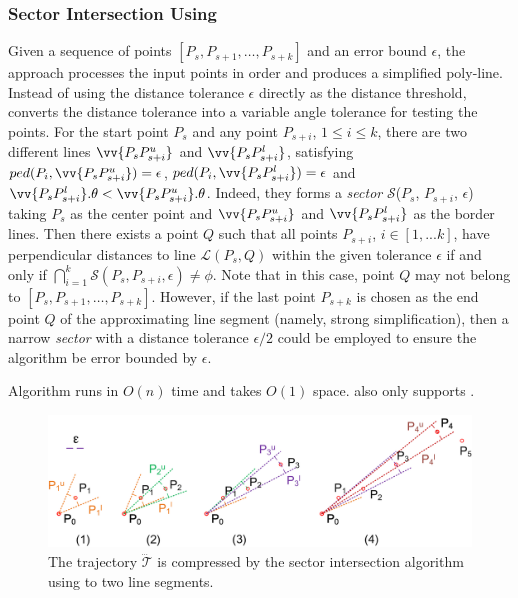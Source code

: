 \subsubsection {Sector Intersection Using \ped}
\label{sec-siped}

Given a sequence of points $[P_{s}, P_{s+1}, \ldots, P_{s+k}]$ and an error bound $\epsilon$, the \siped approach processes the input points in order and produces a simplified poly-line. Instead of using the distance tolerance $\epsilon$ directly as the distance threshold, \siped converts the distance tolerance into a variable angle tolerance for testing the points.
%
For the start point $P_s$ and any point $P_{s+i}$, $1\le i\le k$, there are two different lines $\vv{P_sP^u_{s+i}}$ and $\vv{P_sP^l_{s+i}}$, satisfying $ped(P_i, \vv{P_sP^u_{s+i}}) = \epsilon$, $ped(P_i, \vv{P_sP^l_{s+i}}) = \epsilon$ and $\vv{P_sP^l_{s+i}}.\theta < \vv{P_sP^u_{s+i}}.\theta$. Indeed, they forms a \emph{sector} $\mathcal{S}$($P_s$, $P_{s+i}$, $\epsilon$) taking $P_s$ as the center point and $\vv{P_sP^u_{s+i}}$ and $\vv{P_sP^l_{s+i}}$ as the border lines.
Then there exists a point $Q$ such that all points $P_{s+i}$, $i \in [1, ... k]$, have perpendicular distances to
line $\mathcal{L}(P_s,Q)$ within the given \ped tolerance $\epsilon$ if and only if $\bigcap_{i=1}^{k}\mathcal{S}(P_s, P_{s+i}, \epsilon) \ne \phi$.
Note that in this case, point $Q$ may not belong to $[P_{s}, P_{s+1}, \ldots, P_{s+k}]$.
However, if the last point $P_{s+k}$ is chosen as the end point $Q$ of the approximating line segment (namely, strong simplification), then a narrow \emph{sector} with a distance tolerance $\epsilon/2$ could be employed to ensure the algorithm be \ped error bounded by $\epsilon$\cite{Zhao:Sleeve}.

Algorithm \siped runs in $O(n)$ time and takes $O(1)$ space.
\siped also only supports \ped.


\begin{figure}[tb!]
	\centering
	\includegraphics[scale=0.66]{figures/Fig-sleeve.png}
	\vspace{-3ex}
	\caption{\small The trajectory $\dddot{\mathcal{T}}$ is compressed by the sector intersection algorithm using \ped to two line segments.}
	\vspace{-2ex}
	\label{fig:sleeve}
\end{figure}


